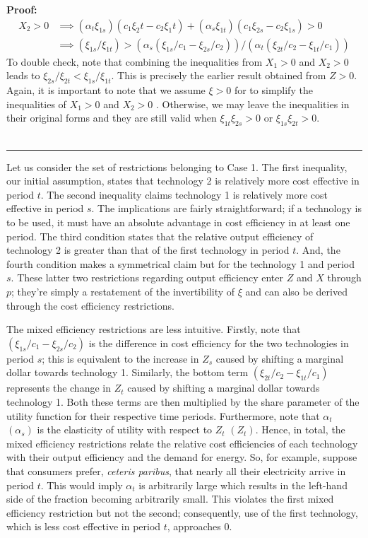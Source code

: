 \documentclass[11pt,a4paper]{extarticle}
\newenvironment{proof}[1][Proof]{\noindent\textbf{#1:} }{\ \rule{0.5em}{0.5em}}
\begin{document}
\begin{proof}
	\begin{align*}
	X_2 > 0 &\implies (\alpha_t \xi_{1s})(c_1 \xi_2t - c_2\xi_1t) + (\alpha_s \xi_{1t})(c_1 \xi_{2s} - c_2 \xi_{1s}) > 0\\
	&\implies (\xi_{1s}/\xi_{1t}) > (\alpha_s (\xi_{1s}/c_1 -  \xi_{2s}/c_2))/(\alpha_t(\xi_{2t}/c_2 - \xi_{1t}/c_1)) 
	\end{align*}
	To double check, note that combining the inequalities from $X_1>0$ and $X_2 > 0$ leads to $\xi_{2s}/\xi_{2t} < \xi_{1s}/\xi_{1t}$. This is precisely the earlier result obtained from $Z > 0$. Again, it is  important to note that we assume $\xi > 0$ for to simplify the inequalities of $X_1 > 0$ and $X_2 > 0$ . Otherwise, we may leave the inequalities in their original forms and they are still valid when  $\xi_{1t} \xi_{2s} > 0$ or $\xi_{1s} \xi_{2t} > 0$.   \\ \hfill
\end{proof}

Let us consider the set of restrictions belonging to Case 1. The first inequality, our initial assumption, states that technology 2 is relatively more cost effective in period $t$. The second inequality claims technology 1 is relatively more cost effective in period $s$. The implications are fairly straightforward; if a technology is to be used, it must have an absolute advantage in cost efficiency in at least one period. The third condition states that the relative output efficiency of technology 2 is greater than that of the first technology in period $t$. And, the fourth condition makes a symmetrical claim but for the technology 1 and period $s$. These latter two restrictions regarding output efficiency enter $Z$ and $X$ through $p$; they're simply a restatement of the invertibility of $\xi$ and can also be derived through the cost efficiency restrictions. 

The mixed efficiency restrictions are less intuitive. Firstly, note that $\left(\xi_{1s}/c_1 - \xi_{2s}/c_2\right)$ is the difference in cost efficiency for the two technologies in period $s$; this is equivalent to the increase in $Z_s$ caused by shifting a marginal dollar towards technology 1. Similarly, the bottom term $\left( \xi_{2t}/c_2 - \xi_{1t}/c_1 \right)$ represents the change in $Z_t$ caused by shifting a marginal dollar towards technology 1. Both these terms are then multiplied by the share parameter of the utility function for their respective time periods. Furthermore, note that $\alpha_t$ $(\alpha_s)$ is the elasticity of utility with respect to $Z_t$ $(Z_t)$. Hence, in total, the mixed efficiency restrictions relate the relative cost efficiencies of each technology with their output efficiency and the demand for energy. So, for example, suppose that consumers prefer, \textit{ceteris paribus}, that nearly all their electricity arrive in period $t$. This would imply $\alpha_t$ is arbitrarily large which results in the left-hand side of the fraction becoming arbitrarily small. This violates the first mixed efficiency restriction but not the second; consequently, use of the first technology, which is less cost effective in period $t$, approaches $0$. 
\end{document}
